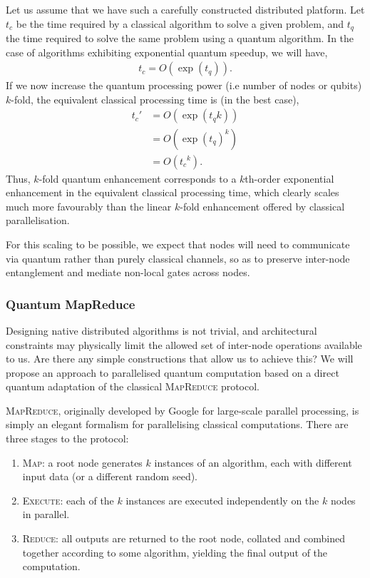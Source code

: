 Let us assume that we have such a carefully constructed distributed platform. Let $t_c$ be the time required by a classical algorithm to solve a given problem, and $t_q$ the time required to solve the same problem using a quantum algorithm. In the case of algorithms exhibiting exponential quantum speedup, we will have,
\begin{align}
t_c = O(\exp (t_q)).
\end{align}
If we now increase the quantum processing power (i.e number of nodes or qubits) $k$-fold, the equivalent classical processing time is (in the best case),
\begin{align}
t_c' &= O(\exp (t_q k)) \nonumber \\
&= O(\exp (t_q)^{k}) \nonumber \\
&= O({t_c}^{k}).
\end{align}
Thus, $k$-fold quantum enhancement corresponds to a $k$th-order exponential enhancement in the equivalent classical processing time, which clearly scales much more favourably than the linear $k$-fold enhancement offered by classical parallelisation.

For this scaling to be possible, we expect that nodes will need to communicate via quantum rather than purely classical channels, so as to preserve inter-node entanglement and mediate non-local gates across nodes.

\subsubsection{Quantum MapReduce}

Designing native distributed algorithms is not trivial, and architectural constraints may physically limit the allowed set of inter-node operations available to us. Are there any simple constructions that allow us to achieve this? We will propose an approach to parallelised quantum computation based on a direct quantum adaptation of the classical \textsc{MapReduce} protocol.

\textsc{MapReduce}, originally developed by Google for large-scale parallel processing, is simply an elegant formalism for parallelising classical computations. There are three stages to the protocol:
\begin{enumerate}
	\item \textsc{Map}: a root node generates $k$ instances of an algorithm, each with different input data (or a different random seed).
	\item \textsc{Execute}: each of the $k$ instances are executed independently on the $k$ nodes in parallel.
	\item \textsc{Reduce}: all outputs are returned to the root node, collated and combined together according to some algorithm, yielding the final output of the computation.
\end{enumerate}

